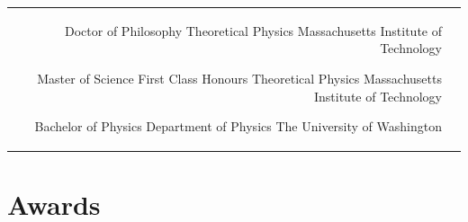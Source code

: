 \documentclass[10pt]{article} %
\begin{document}
\begin{paracol}{2}

\begin{supertabular}{rl} %

	
	{Doctor of Philosophy} %
	{} %
	{Theoretical Physics} %
	{Massachusetts Institute of Technology} %
	
	
	{Master of Science} %
	{First Class Honours} %
	{Theoretical Physics} %
	{Massachusetts Institute of Technology} %
	
	
	{Bachelor of Physics} %
	{} %
	{Department of Physics} %
	{The University of Washington} %
	

\end{supertabular}


\section{Awards}





\begin{supertabular}{rl} %
	

\end{supertabular}
\end{paracol}
\end{document}
